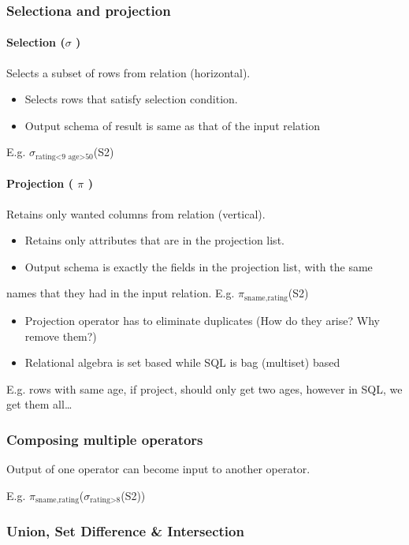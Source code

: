 \documentclass[11pt]{article}
\begin{document}
\subsubsection{Selectiona and projection}
\label{sec:orgaac5dd6}
\paragraph{Selection (\(\sigma\) )}
\label{sec:org050bcc6}
Selects a subset of rows from relation (horizontal).
\begin{itemize}
\item Selects rows that satisfy selection condition.
\item Output schema of result is same as that of the input relation
\end{itemize}
E.g. \(\sigma_{\text{rating<9 \^{} age>50}}\)(S2)
\paragraph{Projection ( \(\pi\) )}
\label{sec:org91e4643}
Retains only wanted columns from relation (vertical).
\begin{itemize}
\item Retains only attributes that are in the projection list.
\item Output schema is exactly the fields in the projection list, with the same
\end{itemize}
names that they had in the input relation.
E.g. \(\pi_{\text{sname,rating}}\)(S2)
\begin{itemize}
\item Projection operator has to eliminate duplicates (How do they arise? Why remove them?)
\item Relational algebra is set based while SQL is bag (multiset) based
\end{itemize}
E.g. rows with same age, if project, should only get two ages, however in SQL,
we get them all\ldots{}
\subsubsection{Composing multiple operators}
\label{sec:org70d1d7f}
Output of one operator can become input to another operator.

E.g. \(\pi_{\text{sname,rating}}\)(\(\sigma_{\text{rating>8}}\)(S2))
\subsubsection{Union, Set Difference \& Intersection}
\label{sec:orgf9fd674}
\end{document}
